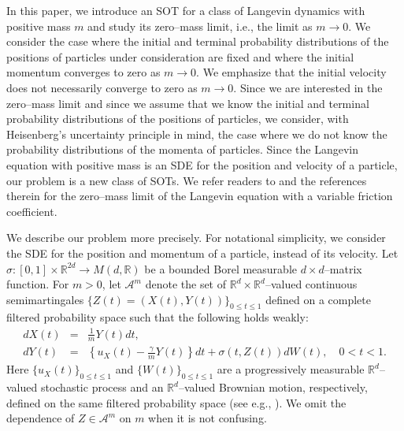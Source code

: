 \documentclass[12pt]{article}
\begin{document}
In this paper, we introduce an SOT for a class of Langevin dynamics with positive mass $m$ and study its zero--mass limit, i.e., the limit as $m\to 0$.
We consider the case where the initial and terminal probability distributions of the positions of  particles under consideration are fixed
and where the initial momentum converges to zero as $m\to 0$.
We emphasize that the initial velocity does not necessarily converge to zero as $m\to 0$.
Since we are interested in the zero--mass limit and since we assume that we know the initial and terminal probability distributions of the positions of particles,
we consider, with Heisenberg's uncertainty principle in mind, the case where we do not know the probability distributions of the momenta of particles.
Since the Langevin equation with positive mass is an SDE for the position and velocity of a particle, our problem is a new class of SOTs.
We refer readers to \cite{Birrell, FW-1, FW-2, Ishii} and the references therein for the zero--mass limit of the Langevin equation with a variable friction coefficient.



We describe our problem more precisely.
For notational simplicity, we consider the SDE for the position and momentum of a particle, instead of its velocity.
Let $\sigma:[0,1]\times \mathbb{R}^{2d}\rightarrow M(d,\mathbb{R})$
 be a bounded Borel measurable $d\times d$--matrix function.
For $m>0$, let $\mathcal{A}^m$ denote the set of $\mathbb{R}^{d}\times \mathbb{R}^{d}$--valued continuous semimartingales $\{Z(t)=(X(t),Y(t))\}_{0\le t\le 1}$ defined on a complete filtered probability space such that the following holds weakly:
\begin{eqnarray}
dX(t)&=&\frac{1}{m}Y(t)dt,\label{1.1}\\
dY(t)&=&\left\{u_X(t)-\frac{\gamma }{m}Y(t)\right\}dt+\sigma(t,Z(t))dW(t),\quad 0< t<1.\label{1.2}%
\end{eqnarray}
Here  $\{u_X (t)\}_{0\le t\le 1}$ and $\{W(t)\}_{0\le t\le 1}$ are
a progressively measurable $\mathbb{R}^d$--valued stochastic process
and an $\mathbb{R}^d$--valued Brownian motion, respectively, defined on the same filtered probability space (see e.g., \cite{IW14}).
We omit the dependence of $Z\in \mathcal{A}^m$ on $m$ when it is not confusing.
\end{document}
